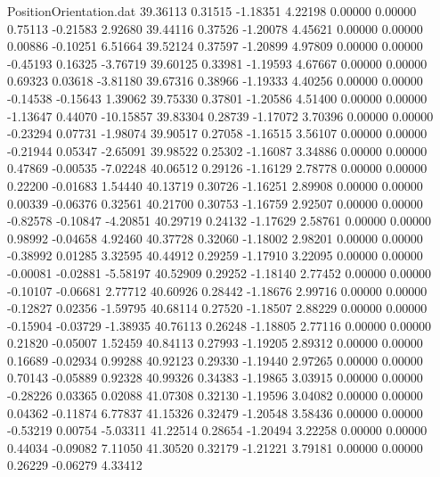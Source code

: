 \begin{filecontents}{PositionOrientation.dat}
  39.36113    0.31515   -1.18351     4.22198    0.00000    0.00000    0.75113   -0.21583    2.92680
  39.44116    0.37526   -1.20078     4.45621    0.00000    0.00000    0.00886   -0.10251    6.51664
  39.52124    0.37597   -1.20899     4.97809    0.00000    0.00000   -0.45193    0.16325   -3.76719
  39.60125    0.33981   -1.19593     4.67667    0.00000    0.00000    0.69323    0.03618   -3.81180
  39.67316    0.38966   -1.19333     4.40256    0.00000    0.00000   -0.14538   -0.15643    1.39062
  39.75330    0.37801   -1.20586     4.51400    0.00000    0.00000   -1.13647    0.44070  -10.15857
  39.83304    0.28739   -1.17072     3.70396    0.00000    0.00000   -0.23294    0.07731   -1.98074
  39.90517    0.27058   -1.16515     3.56107    0.00000    0.00000   -0.21944    0.05347   -2.65091
  39.98522    0.25302   -1.16087     3.34886    0.00000    0.00000    0.47869   -0.00535   -7.02248
  40.06512    0.29126   -1.16129     2.78778    0.00000    0.00000    0.22200   -0.01683    1.54440
  40.13719    0.30726   -1.16251     2.89908    0.00000    0.00000    0.00339   -0.06376    0.32561
  40.21700    0.30753   -1.16759     2.92507    0.00000    0.00000   -0.82578   -0.10847   -4.20851
  40.29719    0.24132   -1.17629     2.58761    0.00000    0.00000    0.98992   -0.04658    4.92460
  40.37728    0.32060   -1.18002     2.98201    0.00000    0.00000   -0.38992    0.01285    3.32595
  40.44912    0.29259   -1.17910     3.22095    0.00000    0.00000   -0.00081   -0.02881   -5.58197
  40.52909    0.29252   -1.18140     2.77452    0.00000    0.00000   -0.10107   -0.06681    2.77712
  40.60926    0.28442   -1.18676     2.99716    0.00000    0.00000   -0.12827    0.02356   -1.59795
  40.68114    0.27520   -1.18507     2.88229    0.00000    0.00000   -0.15904   -0.03729   -1.38935
  40.76113    0.26248   -1.18805     2.77116    0.00000    0.00000    0.21820   -0.05007    1.52459
  40.84113    0.27993   -1.19205     2.89312    0.00000    0.00000    0.16689   -0.02934    0.99288
  40.92123    0.29330   -1.19440     2.97265    0.00000    0.00000    0.70143   -0.05889    0.92328
  40.99326    0.34383   -1.19865     3.03915    0.00000    0.00000   -0.28226    0.03365    0.02088
  41.07308    0.32130   -1.19596     3.04082    0.00000    0.00000    0.04362   -0.11874    6.77837
  41.15326    0.32479   -1.20548     3.58436    0.00000    0.00000   -0.53219    0.00754   -5.03311
  41.22514    0.28654   -1.20494     3.22258    0.00000    0.00000    0.44034   -0.09082    7.11050
  41.30520    0.32179   -1.21221     3.79181    0.00000    0.00000    0.26229   -0.06279    4.33412

\end{filecontents}
